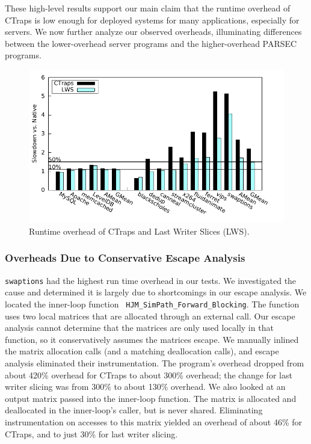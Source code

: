 \documentclass[preprint,9pt]{sigplanconf}
\newcommand{\ctraps}{CTraps\xspace}
\begin{document}
These high-level results support our main claim that the runtime overhead of
\ctraps is low enough for deployed systems for many applications, especially
for servers.  We now further analyze our observed overheads, illuminating
differences between the lower-overhead server programs and the higher-overhead
PARSEC programs.

\begin{figure}
\centering
\includegraphics[width=.9\columnwidth]{plots/perf.pdf}
\caption{\label{fig:perfall}Runtime overhead of \ctraps and Last Writer Slices (LWS).}
\end{figure}

\subsubsection{Overheads Due to Conservative Escape Analysis}
\label{sec:eval:conservative}
{\tt swaptions} had the highest run time overhead in our tests.  We
investigated the cause and determined it is largely due to shortcomings in our
escape analysis.  We located the inner-loop function {\tt
HJM\_SimPath\_Forward\_Blocking}.  The function uses two local matrices that
are allocated through an external call.  Our escape analysis cannot determine
that the matrices are only used locally in that function, so it conservatively
assumes the matrices escape.  We manually inlined the matrix allocation calls
(and a matching deallocation calls), and escape analysis eliminated their
instrumentation.  The program's overhead dropped from about 420\% overhead for
\ctraps to about 300\% overhead; the change for last writer slicing was from
300\% to about 130\% overhead.  We also looked at an output matrix passed into
the inner-loop function.  The matrix is allocated and deallocated in the
inner-loop's caller, but is never shared.  Eliminating instrumentation on
accesses to this matrix yielded an overhead of about 46\% for \ctraps, and to
just 30\% for last writer slicing.  
\end{document}
